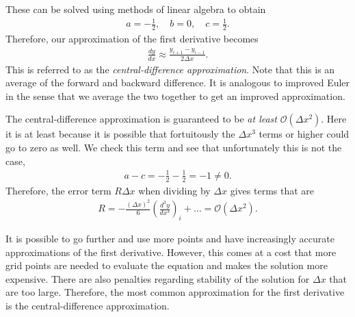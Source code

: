 These can be solved using methods of linear algebra to obtain
\begin{align}
  a = -\frac{1}{2}, \quad b = 0, \quad c = \frac{1}{2} . \nonumber
\end{align}
Therefore, our approximation of the first derivative becomes
\begin{align}
  \frac{dy}{dx} \approx \frac{ y_{i+1} - y_{i-1} }{ 2 \Delta x } .
\end{align}
This is referred to as the \emph{central-difference approximation}. Note that this is an average of the forward and backward difference. It is analogous to improved Euler in the sense that we average the two together to get an improved approximation.

The central-difference approximation is guaranteed to be \emph{at least} $\mathcal{O}(\Delta x^2)$. Here it is at least because it is possible that fortuitously the $\Delta x^3$ terms or higher could go to zero as well. We check this term and see that unfortunately this is not the case,
\begin{align}
  a - c = -\frac{1}{2} - \frac{1}{2} = -1 \ne 0. \nonumber
\end{align}
Therefore, the error term $R \Delta x$ when dividing by $\Delta x$ gives terms that are
\begin{align}
  R = -\frac{(\Delta x)^2}{6} \left( \frac{d^3 y}{dx^3} \right)_i  + \ldots = \mathcal{O}( \Delta x^2 ) .
\end{align}

It is possible to go further and use more points and have increasingly accurate approximations of the first derivative. However, this comes at a cost that more grid points are needed to evaluate the equation and makes the solution more expensive. There are also penalties regarding stability of the solution for $\Delta x$ that are too large. Therefore, the most common approximation for the first derivative is the central-difference approximation.

